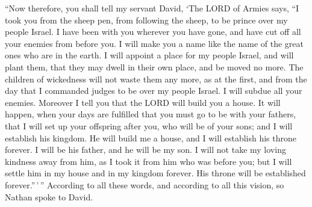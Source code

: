  ``Now therefore, you shall tell my servant David, `The
LORD of Armies says, ``I took you from the sheep pen, from following the
sheep, to be prince over my people Israel.  I have been
with you wherever you have gone, and have cut off all your enemies from
before you. I will make you a name like the name of the great ones who
are in the earth.  I will appoint a place for my people
Israel, and will plant them, that they may dwell in their own place, and
be moved no more. The children of wickedness will not waste them any
more, as at the first,  and from the day that I commanded
judges to be over my people Israel. I will subdue all your enemies.
Moreover I tell you that the LORD will build you a house.
 It will happen, when your days are fulfilled that you
must go to be with your fathers, that I will set up your offspring after
you, who will be of your sons; and I will establish his kingdom.
 He will build me a house, and I will establish his
throne forever.  I will be his father, and he will be my
son. I will not take my loving kindness away from him, as I took it from
him who was before you;  but I will settle him in my
house and in my kingdom forever. His throne will be established
forever.''\,'\,''  According to all these words, and
according to all this vision, so Nathan spoke to David.

